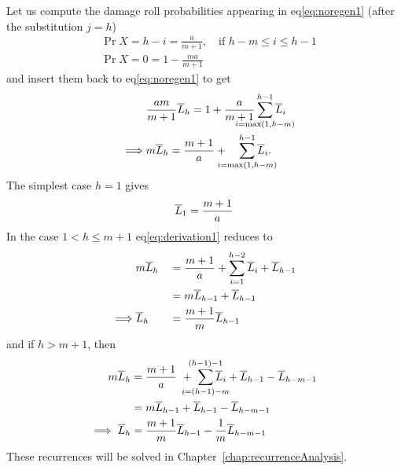 Let us compute the damage roll probabilities appearing in eq\ref{eq:noregen1} (after the substitution $j = h$)
\begin{align}
    &\Pr{X=h-i} = \frac{a}{m+1}, \quad\mbox{if } h-m \leq i \leq h-1\\
    &\Pr{X=0} = 1 - \frac{ma}{m+1}
\end{align}
and insert them back to eq\ref{eq:noregen1} to get
\begin{align}
    &\frac{am}{m+1}\L_h = 1 + \frac{a}{m+1}\sum_{\mathclap{i=\max(1,h-m)}}^{h-1}\L_i\nonumber\\
	\implies &m\L_h = \frac{m+1}{a} + \quad\sum_{\mathclap{i=\max(1,h-m)}}^{h-1}\L_i\label{eq:derivation1}.
\end{align}
The simplest case $h=1$ gives
\begin{align}
    \overline{L}_1 = \frac{m+1}{a}
\end{align}
In the case $1 < h \leq m+1$ eq\ref{eq:derivation1} reduces to
\begin{alignat}{3}
    &m\overline{L}_h           &\;=\;& \frac{m + 1}{a} + \sum_{i=1}^{h-2}\overline{L}_{i} + \overline{L}_{h-1}\nonumber\\
    &                &\;=\;& m\overline{L}_{h-1} + \overline{L}_{h-1}\nonumber\\
    \implies &\overline{L}_{h} &\;=\;& \frac{m+1}{m}\overline{L}_{h-1}\label{eq:geometricRecurrence}
\end{alignat}
and if $h > m+1$, then
\begin{align}
    m\L_h
          &= \frac{m + 1}{a}\ +\ \sum_{\mathclap{i=(h-1)-m}}^{\mathclap{(h-1)-1}} \L_i + \L_{h-1} - \L_{h-m-1}\nonumber\\
          &= m\L_{h-1} + \L_{h-1} -\L_{h-m-1}\nonumber\\
    \implies \L_{h} &= \frac{m+1}{m}\L_{h-1} -\frac{1}{m}\L_{h-m-1}\label{eq:complexRecurrence}
\end{align}
These recurrences will be solved in Chapter~\ref{chap:recurrenceAnalysis}.
